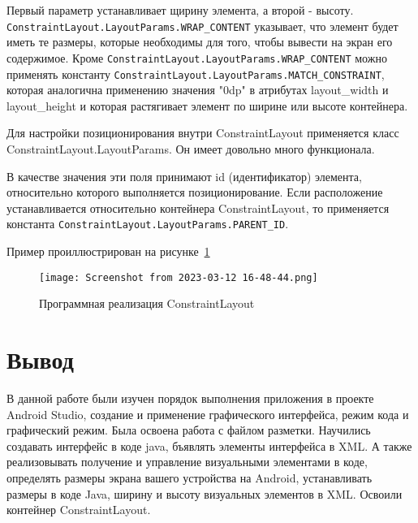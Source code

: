 Первый параметр устанавливает щирину элемента, а второй - высоту.
\texttt{ConstraintLayout.LayoutParams.WRAP\_CONTENT} указывает, что элемент
будет иметь те размеры, которые необходимы для того, чтобы вывести на
экран его содержимое. Кроме
\texttt{ConstraintLayout.LayoutParams.WRAP\_CONTENT} можно применять
константу \texttt{ConstraintLayout.LayoutParams.MATCH\_CONSTRAINT}, которая
аналогична применению значения "0dp" в атрибутах layout\_width и
layout\_height и которая растягивает элемент по ширине или высоте
контейнера.\par
Для настройки позиционирования внутри ConstraintLayout применяется класс
ConstraintLayout.LayoutParams. Он имеет довольно много функционала.\par
В качестве значения эти поля принимают id (идентификатор) элемента,
относительно которого выполняется позиционирование. Если расположение
устанавливается относительно контейнера ConstraintLayout, то применяется
константа \texttt{ConstraintLayout.LayoutParams.PARENT\_ID}.

Пример проиллюстрирован на рисунке~\ref{fig:java:constrainly}

\begin{figure}[h!tp]
	\centering
	\texttt{[image: Screenshot from 2023-03-12 16-48-44.png]}
	\caption{Программная реализация ConstraintLayout}
	\label{fig:java:constrainly}
\end{figure}

\clearpage

\section*{\LARGE{Вывод}}
В данной работе были изучен порядок выполнения приложения
в проекте Android Studio, создание и применение графического интерфейса,
режим кода и графический режим. Была освоена работа с файлом разметки.
Научились создавать интерфейс в коде java, бъявлять элементы интерфейса в XML.
А также реализовывать получение и управление визуальными элементами в коде,
определять размеры экрана вашего устройства на Android,
устанавливать размеры в коде Java, ширину и высоту визуальных элементов в XML.
Освоили контейнер ConstraintLayout.

